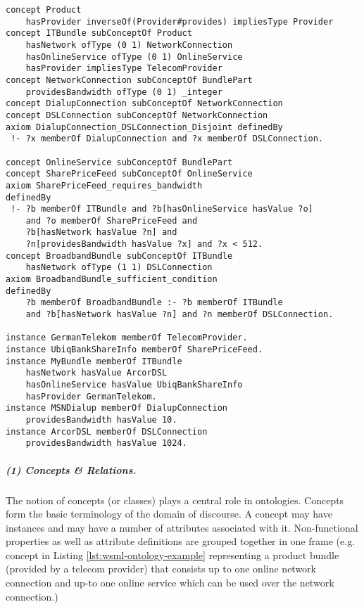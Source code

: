 \begin{lstlisting}[label=lst:wsml-ontology-example,style=wsml, caption=WSML Example Ontology]
concept Product
    hasProvider inverseOf(Provider#provides) impliesType Provider
concept ITBundle subConceptOf Product
    hasNetwork ofType (0 1) NetworkConnection
    hasOnlineService ofType (0 1) OnlineService
    hasProvider impliesType TelecomProvider
concept NetworkConnection subConceptOf BundlePart
    providesBandwidth ofType (0 1) _integer
concept DialupConnection subConceptOf NetworkConnection
concept DSLConnection subConceptOf NetworkConnection
axiom DialupConnection_DSLConnection_Disjoint definedBy
 !- ?x memberOf DialupConnection and ?x memberOf DSLConnection.

concept OnlineService subConceptOf BundlePart
concept SharePriceFeed subConceptOf OnlineService
axiom SharePriceFeed_requires_bandwidth
definedBy
 !- ?b memberOf ITBundle and ?b[hasOnlineService hasValue ?o]
    and ?o memberOf SharePriceFeed and
    ?b[hasNetwork hasValue ?n] and
    ?n[providesBandwidth hasValue ?x] and ?x < 512.
concept BroadbandBundle subConceptOf ITBundle
    hasNetwork ofType (1 1) DSLConnection
axiom BroadbandBundle_sufficient_condition
definedBy
    ?b memberOf BroadbandBundle :- ?b memberOf ITBundle
    and ?b[hasNetwork hasValue ?n] and ?n memberOf DSLConnection.

instance GermanTelekom memberOf TelecomProvider.
instance UbiqBankShareInfo memberOf SharePriceFeed.
instance MyBundle memberOf ITBundle
    hasNetwork hasValue ArcorDSL
    hasOnlineService hasValue UbiqBankShareInfo
    hasProvider GermanTelekom.
instance MSNDialup memberOf DialupConnection
    providesBandwidth hasValue 10.
instance ArcorDSL memberOf DSLConnection
    providesBandwidth hasValue 1024.

\end{lstlisting}

\subparagraph{\it \bfseries (1) Concepts \& Relations.} The notion of concepts
(or classes) plays a central role in ontologies. Concepts form the
basic terminology of the domain of discourse. A concept may have
instances and may have a number of attributes associated with it.
Non-functional properties as well
as attribute definitions are grouped together in one frame (e.g.
concept  in Listing \ref{lst:wsml-ontology-example}
representing a product bundle (provided by
a telecom provider) that consists up to one online network
connection and up-to one online service which can be used over the
network connection.)

